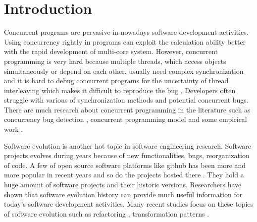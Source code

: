 \documentclass[conference]{IEEEtran}
\begin{document}
\section{Introduction}
Concurrent programs are pervasive \cite{journals/jss/PintoTFFB15} in nowadays software development activities. Using concurrency rightly in programs can exploit the calculation ability better with the rapid development of multi-core system. However, concurrent programming is very hard \cite{journals/corr/McKenney17, journals/queue/SutterL05} because multiple threads, which access objects simultaneously or depend on each other, usually need complex synchronization and it is hard to debug concurrent programs for the uncertainty of thread interleaving which makes it difficult to reproduce the bug \cite{conf/asplos/LuPSZ08}. Developers often struggle with various of synchronization methods and potential concurrent bugs. There are much research about concurrent programming in the literature such as concurrency bug detection \cite{conf/pldi/FlanaganF09, conf/kbse/KroeningPSW16, conf/pldi/FlanaganFY08}, concurrent programming model \cite{conf/java/Lea00, conf/oopsla/Bagherzadeh15} and some empirical work \cite{conf/sosp/DavidGT13, conf/oopsla/PintoTC15}.

Software evolution is another hot topic in software engineering research. Software projects evolves during years because of new functionalities, bugs, reorganization of code. A few of open source software platforms like github has been more and more popular in recent years and so do the projects hosted there \cite{conf/icsm/Borges16, conf/icsm/BorgesHV16}. They hold a huge amount of software projects and their historic versions. Researchers have shown that software evolution history can provide much useful information for today's software development activities. Many recent studies focus on these topics of software evolution such as refactoring \cite{conf/icse/KimBDA16, conf/icsm/WahlerDS16}, transformation patterns \cite{conf/wcre/JiangPWXZ15, conf/icse/MengKM13}.
\end{document}
